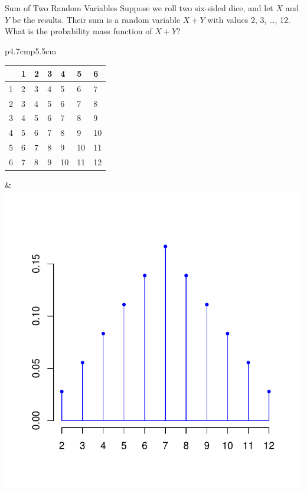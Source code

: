 \documentclass[handout]{beamer}
\begin{document}
\begin{frame}{Sum of Two Random Variables}
    Suppose we roll two six-sided dice, and let $X$ and $Y$ be the results. Their sum is a random variable $X+Y$ with values 2, 3, \dots, 12. What is the probability mass function of $X+Y$?
    
    \pause\vspace{-.5cm}\begin{center}
    \begin{tabular}{p{4.7cm}p{5.5cm}}
    \vspace{0cm}
    \begin{tabular}{l||p{.3cm}|p{.3cm}|p{.3cm}|p{.3cm}|p{.3cm}|p{.3cm}|}
    & 1 & 2 & 3 & 4 & 5 & 6 \\ \hline \hline
    1& 2 & 3 & 4 & 5 & 6 & 7 \\ \hline
    2& 3 & 4 & 5 & 6 & 7 &  8  \\ \hline
    3& 4 & 5 & 6 & 7 &  8 & 9 \\ \hline
    4& 5 & 6 & 7 &  8 & 9 & 10\\ \hline
    5& 6 & 7 &  8 & 9 &10 & 11\\ \hline
    6& 7 &  8 & 9 & 10 & 11 & 12\\ \hline
    \end{tabular}
    &
    \vspace{-1.5cm}
    \includegraphics[scale=.5]{ch3_pmf2.pdf}
    \end{tabular}
    

\end{center}
\end{frame}
\end{document}
